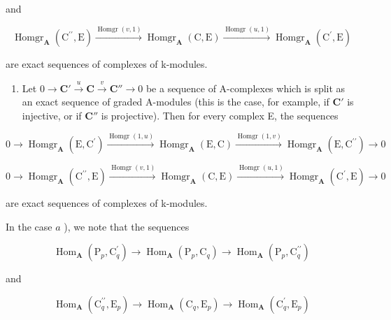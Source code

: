 and

\[
\operatorname{Homgr} _ {\mathbf {A}} \left(\mathrm{C} ^ {\prime \prime}, \mathrm{E}\right) \xrightarrow {\operatorname{Homgr} (v , 1)} \operatorname{Homgr} _ {\mathbf {A}} (\mathrm{C}, \mathrm{E}) \xrightarrow {\operatorname{Homgr} (u , 1)} \operatorname{Homgr} _ {\mathbf {A}} \left(\mathrm{C} ^ {\prime}, \mathrm{E}\right)
\]

are exact sequences of complexes of k-modules.

\begin{enumerate}
\def\labelenumi{\alph{enumi})}
\setcounter{enumi}{1}
\tightlist
\item
  Let \(0 \to \mathbf{C}' \xrightarrow{u} \mathbf{C} \xrightarrow{v} \mathbf{C}'' \to 0\) be a sequence of A-complexes which is split as an exact sequence of graded A-modules (this is the case, for example, if \(\mathbf{C}'\) is injective, or if \(\mathbf{C}''\) is projective). Then for every complex E, the sequences
\end{enumerate}

\[
0 \rightarrow \operatorname{Homgr} _ {\mathbf {A}} (\mathrm{E}, \mathrm{C} ^ {\prime}) \xrightarrow {\operatorname{Homgr} (1 , u)} \operatorname{Homgr} _ {\mathbf {A}} (\mathrm{E}, \mathrm{C}) \xrightarrow {\operatorname{Homgr} (1 , v)} \operatorname{Homgr} _ {\mathbf {A}} (\mathrm{E}, \mathrm{C} ^ {\prime \prime}) \rightarrow 0
\]

\[
0 \rightarrow \operatorname{Homgr} _ {\mathbf {A}} \left(\mathrm{C} ^ {\prime \prime}, \mathrm{E}\right) \xrightarrow {\operatorname{Homgr} (v , 1)} \operatorname{Homgr} _ {\mathbf {A}} (\mathrm{C}, \mathrm{E}) \xrightarrow {\operatorname{Homgr} (u , 1)} \operatorname{Homgr} _ {\mathbf {A}} \left(\mathrm{C} ^ {\prime}, \mathrm{E}\right)\rightarrow 0
\]

are exact sequences of complexes of k-modules.

In the case \(a\) ), we note that the sequences

\[
\operatorname{Hom} _ {\mathbf {A}} \left(\mathrm{P} _ {p}, \mathrm{C} _ {q} ^ {\prime}\right)\rightarrow \operatorname{Hom} _ {\mathbf {A}} \left(\mathrm{P} _ {p}, \mathrm{C} _ {q}\right)\rightarrow \operatorname{Hom} _ {\mathbf {A}} \left(\mathrm{P} _ {p}, \mathrm{C} _ {q} ^ {\prime \prime}\right)
\]

and

\[
\operatorname{Hom} _ {\mathbf {A}} \left(\mathrm{C} _ {q} ^ {\prime \prime}, \mathrm{E} _ {p}\right)\rightarrow \operatorname{Hom} _ {\mathbf {A}} \left(\mathrm{C} _ {q}, \mathrm{E} _ {p}\right)\rightarrow \operatorname{Hom} _ {\mathbf {A}} \left(\mathrm{C} _ {q} ^ {\prime}, \mathrm{E} _ {p}\right)
\]

